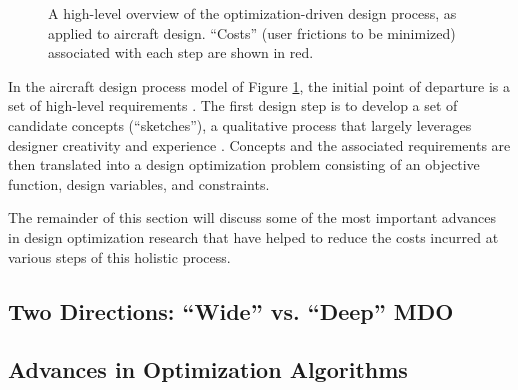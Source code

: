 \documentclass[12pt,vi,oneside]{report}
\begin{document}
    \begin{figure}[H]
        \centering
        \caption{A high-level overview of the optimization-driven design process, as applied to aircraft design. ``Costs'' (user frictions to be minimized) associated with each step are shown in \textcolor[HTML]{BB5045}{red}.} %
        \label{fig:birds_eye_view}
    \end{figure}

    In the aircraft design process model of Figure \ref{fig:birds_eye_view}, the initial point of departure is a set of high-level requirements \cite{torenbeek_synthesis_1976, torenbeek_advanced_2013}. The first design step is to develop a set of candidate concepts (``sketches''), a qualitative process that largely leverages designer creativity and experience \cite{yang_observations_2009, roskam_airplane_1989}. Concepts and the associated requirements are then translated into a design optimization problem consisting of an objective function, design variables, and constraints. %

    The remainder of this section will discuss some of the most important advances in design optimization research that have helped to reduce the costs incurred at various steps of this holistic process.

    \subsection{Two Directions: ``Wide'' vs. ``Deep'' MDO}
    \label{sec:wide_vs_deep}

    \subsection{Advances in Optimization Algorithms}
\end{document}
